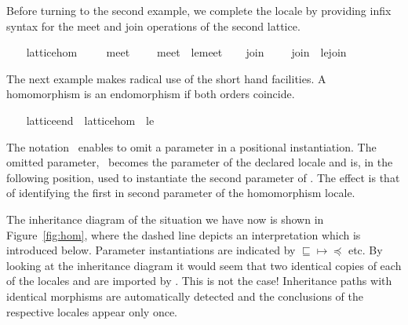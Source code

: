 \begin{isabellebody}
\begin{isamarkuptext}
  Before turning to the second example, we complete the locale by
  providing infix syntax for the meet and join operations of the
  second lattice.%
\end{isamarkuptext}%
\isamarkuptrue%
\ \ \isamarkupfalse%
\ lattice{\isacharunderscore}hom\ \isanewline
\ \ \isamarkupfalse%
\ meet{\isacharprime}\ {\isacharparenleft}\ {\isachardoublequoteopen}{\isasymsqinter}{\isacharprime}{\isacharprime}{\isachardoublequoteclose}\ {}{}{\isacharparenright}\ \ {\isachardoublequoteopen}meet{\isacharprime}\ {\isasymequiv}\ le{\isacharprime}{\isachardot}meet{\isachardoublequoteclose}\isanewline
\ \ \isamarkupfalse%
\ join{\isacharprime}\ {\isacharparenleft}\ {\isachardoublequoteopen}{\isasymsqunion}{\isacharprime}{\isacharprime}{\isachardoublequoteclose}\ {}{}{\isacharparenright}\ \ {\isachardoublequoteopen}join{\isacharprime}\ {\isasymequiv}\ le{\isacharprime}{\isachardot}join{\isachardoublequoteclose}\isanewline
\ \ \isamarkupfalse%
%
\begin{isamarkuptext}%
The next example makes radical use of the short hand
  facilities.  A homomorphism is an endomorphism if both orders
  coincide.%
\end{isamarkuptext}%
\isamarkuptrue%
\ \ \isamarkupfalse%
\ lattice{\isacharunderscore}end\ {\isacharequal}\ lattice{\isacharunderscore}hom\ {\isacharunderscore}\ le%
\begin{isamarkuptext}%
The notation~\isa{{\isacharunderscore}} enables to omit a parameter in a
  positional instantiation.  The omitted parameter,~ becomes
  the parameter of the declared locale and is, in the following
  position, used to instantiate the second parameter of .  The effect is that of identifying the first in second
  parameter of the homomorphism locale.%
\end{isamarkuptext}%
\isamarkuptrue%
%
\begin{isamarkuptext}%
The inheritance diagram of the situation we have now is shown
  in Figure~\ref{fig:hom}, where the dashed line depicts an
  interpretation which is introduced below.  Parameter instantiations
  are indicated by $\sqsubseteq \mapsto \preceq$ etc.  By looking at
  the inheritance diagram it would seem
  that two identical copies of each of the locales  and  are imported by .  This is not the case!  Inheritance paths with
  identical morphisms are automatically detected and
  the conclusions of the respective locales appear only once.


\end{isamarkuptext}
\end{isabellebody}
